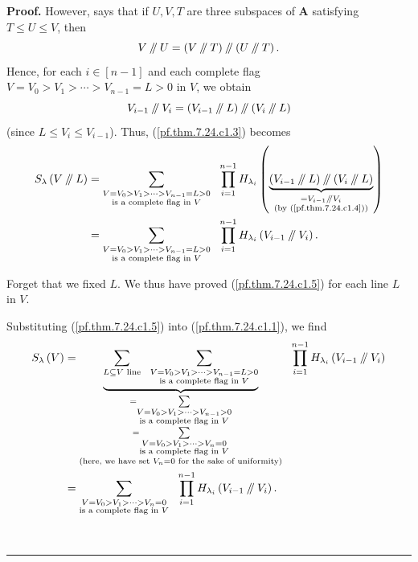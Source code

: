\documentclass[numbers=enddot,12pt,final,onecolumn,notitlepage]{scrartcl}%
\numberwithin{exer}{section}
\theoremstyle{definition}
\newenvironment{proof}[1][Proof]{\noindent\textbf{#1.} }{\ \rule{0.5em}{0.5em}}
\let\sumnonlimits\sum
\let\prodnonlimits\prod
\renewcommand{\sum}{\sumnonlimits\limits}
\renewcommand{\prod}{\prodnonlimits\limits}
\newcommand{\sslash}{\mathbin{/\mkern-5mu/}}
\theoremstyle{plainsl}
\begin{document}
\begin{proof}
However, \cite[(7.16)]{Macdon92} says that if $U,V,T$ are three subspaces of
$\mathbf{A}$ satisfying $T\leq U\leq V$, then%
\[
V\sslash U=\left(  V\sslash T\right)  \sslash \left(  U\sslash T\right)  .
\]
Hence, for each $i\in\left[  n-1\right]  $ and each complete flag
$V=V_{0}>V_{1}>\cdots>V_{n-1}=L>0$ in $V$, we obtain%
\begin{equation}
V_{i-1}\sslash V_{i}=\left(  V_{i-1}\sslash L\right)  \sslash \left(
V_{i}\sslash L\right)  \label{pf.thm.7.24.c1.4}%
\end{equation}
(since $L\leq V_{i}\leq V_{i-1}$). Thus, (\ref{pf.thm.7.24.c1.3}) becomes%
\begin{align}
S_{\lambda}\left(  V\sslash L\right)   &  =\sum_{\substack{V=V_{0}%
>V_{1}>\cdots>V_{n-1}=L>0\\\text{is a complete flag in }V}}\ \ \prod
_{i=1}^{n-1}H_{\lambda_{i}}\left(  \underbrace{\left(  V_{i-1}%
\sslash L\right)  \sslash \left(  V_{i}\sslash L\right)  }_{\substack{=V_{i-1}%
\sslash V_{i}\\\text{(by (\ref{pf.thm.7.24.c1.4}))}}}\right) \nonumber\\
&  =\sum_{\substack{V=V_{0}>V_{1}>\cdots>V_{n-1}=L>0\\\text{is a complete flag
in }V}}\ \ \prod_{i=1}^{n-1}H_{\lambda_{i}}\left(  V_{i-1}\sslash V_{i}%
\right)  . \label{pf.thm.7.24.c1.5}%
\end{align}


Forget that we fixed $L$. We thus have proved (\ref{pf.thm.7.24.c1.5}) for
each line $L$ in $V$.

Substituting (\ref{pf.thm.7.24.c1.5}) into (\ref{pf.thm.7.24.c1.1}), we find%
\begin{align}
S_{\lambda}\left(  V\right)   &  =\underbrace{\sum_{L\subseteq V\text{ line}%
}\ \ \sum_{\substack{V=V_{0}>V_{1}>\cdots>V_{n-1}=L>0\\\text{is a complete
flag in }V}}}_{\substack{=\sum_{\substack{V=V_{0}>V_{1}>\cdots>V_{n-1}%
>0\\\text{is a complete flag in }V}}\\=\sum_{\substack{V=V_{0}>V_{1}%
>\cdots>V_{n}=0\\\text{is a complete flag in }V}}\\\text{(here, we have set
}V_{n}=0\text{ for the sake of uniformity)}}}\ \ \prod_{i=1}^{n-1}%
H_{\lambda_{i}}\left(  V_{i-1}\sslash V_{i}\right) \nonumber\\
&  =\sum_{\substack{V=V_{0}>V_{1}>\cdots>V_{n}=0\\\text{is a complete flag in
}V}}\ \ \prod_{i=1}^{n-1}H_{\lambda_{i}}\left(  V_{i-1}\sslash V_{i}\right)  .
\label{pf.thm.7.24.c1.6}%
\end{align}



\end{proof}
\end{document}
